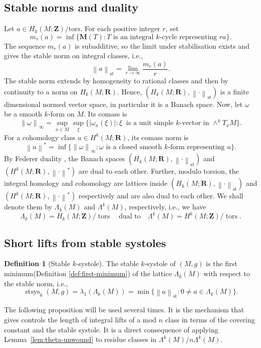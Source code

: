 \documentclass[11pt,reqno]{amsart}
\numberwithin{equation}{section}
\numberwithin{equation}{section}
\theoremstyle{definition}
\newtheorem{definition}[theorem]{Definition}
\newcommand{\R}{\mathbf R}
\newcommand{\Z}{\mathbf Z}
\DeclareMathOperator{\stsys}{stsys}
\DeclareMathOperator{\tors}{tors}
\newcommand{\norm}[1]{\left\lVert #1\right\rVert}
\begin{document}
\subsection{Stable norms and duality}
Let \(a\in H_k(M;\Z)/\mathrm{tors}\). For each positive integer \(r\), set
\[
m_r(a)=\inf\{\mathbf M(T): T \text{ is an integral } k\text{-cycle representing }ra\}.
\]
The sequence \(m_r(a)\) is subadditive, so the limit under stabilisation exists and gives the stable norm on integral classes, i.e.,
\[
\norm{a}_{\mathrm{st}}=\lim_{r\to\infty}\frac{m_r(a)}{r}.
\]
The stable norm extends by homogeneity to rational classes and then by continuity to a norm on \(H_k(M;\R)\). Hence, $(H_k(M;\R), \norm{\cdot}_{\mathrm{st}})$ is a finite dimensional normed vector space, in particular it is a Banach space.
Now, let \(\omega\) be a smooth \(k\)-form on \(M\). Its comass is
\[
\norm{\omega}_{\infty}
=
\sup_{x\in M} \sup_{\xi}
 \{|\omega_x(\xi)|:\xi\ \text{ is a unit simple $k$-vector in } \wedge^kT_xM \}.
\]
For a cohomology class \(u\in H^k(M;\R)\), its comass norm is
\[
\norm{u}^{\ast}
=
\inf\{\norm{\omega}_{\infty}: \omega \text{ is a closed smooth } k\text{-form representing }u\}.
\]
By Federer duality \cite{Federer}, the Banach spaces $(H_k(M;\R), \norm{\cdot}_{\mathrm{st}})$ and $(H^k(M;\R), \norm{\cdot}^{*})$ are dual to each other. Further, modulo torsion, the integral homology and cohomology are lattices inside $(H_k(M;\R), \norm{\cdot}_{\mathrm{st}})$ and $(H^k(M;\R), \norm{\cdot}^{*})$ respectively and are also dual to each other.  We shall denote them by $\Lambda_k(M)$ and $\Lambda^k(M)$, respectively, i.e., we have
\[
\Lambda_k(M)=H_k(M;\Z)/\tors \quad\text{dual to} \quad \Lambda^k(M)=  H^k(M;\Z)/\tors.
\]

\subsection{Short lifts from stable systoles}

\begin{definition}[Stable \(k\)-systole]
The stable \(k\)-systole of \((M,g)\) is the first minimum(Definition \ref{def:first-minimum}) of the lattice $\Lambda_k(M)$ with respect to the stable norm, i.e.,
\[
\stsys_k(M,g)
= \lambda_1(\Lambda_k(M))=
\min\{\norm{a}_{\mathrm{st}}:0\neq a\in\Lambda_k(M)\}.
\]
\end{definition}

The following proposition will be used several times. It is the mechanism that gives controls the length of integral lifts of a mod $n$ class in terms of the covering constant and the stable systole. It is a direct consequence of applying Lemma~\ref{lem:theta-unwound} to residue classes in \(\Lambda^k(M)/n\Lambda^k(M)\).
\end{document}
